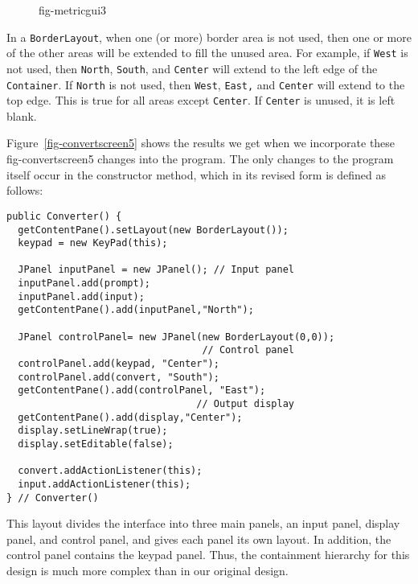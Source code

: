 \begin{figure}[h!]
{fig-metricgui3}
\end{figure}

In a {\tt BorderLayout}, when one (or more) border area is not used,
then one or more of the other areas will be extended to fill the
unused area.  For example, if {\tt West} is not used, then {\tt North},
{\tt South}, and {\tt Center} will extend to the left edge of the
{\tt Container}. If {\tt North} is not used, then {\tt West}, {\tt East,} and
{\tt Center} will extend to the top edge.  This is true for all areas except
{\tt Center}. If {\tt Center} is unused, it is left blank.

\pagebreak
Figure~\ref{fig-convertscreen5} shows the results we get when we incorporate these
{fig-convertscreen5}
changes into the program.  The only changes to the program itself
occur in the constructor method, which in its revised form is defined
as follows:

\begin{jjjlisting}
\begin{lstlisting}
public Converter() {
  getContentPane().setLayout(new BorderLayout());
  keypad = new KeyPad(this);

  JPanel inputPanel = new JPanel(); // Input panel
  inputPanel.add(prompt);
  inputPanel.add(input);
  getContentPane().add(inputPanel,"North");

  JPanel controlPanel= new JPanel(new BorderLayout(0,0)); 
                                  // Control panel
  controlPanel.add(keypad, "Center");
  controlPanel.add(convert, "South");
  getContentPane().add(controlPanel, "East");
                                 // Output display
  getContentPane().add(display,"Center");  
  display.setLineWrap(true);
  display.setEditable(false);

  convert.addActionListener(this);
  input.addActionListener(this);
} // Converter()
\end{lstlisting}
\end{jjjlisting}

\noindent This layout divides the interface into three main panels,
an input panel, display panel, and control panel, and gives each panel
its own layout.  In addition, the control panel contains the keypad
panel.  Thus, the containment hierarchy for this design is
much more complex than in our original design.

